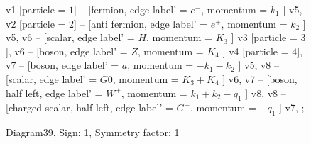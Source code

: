 \documentclass{revtex4}
\begin{document}
\begin{figure}[!htb]
\begin{center}
{    %
v1 [particle = \(1\)] -- [fermion, edge label' = \(e^{-}\), momentum = \(k_{1}\) ] v5, 
v2 [particle = \(2\)] -- [anti fermion, edge label' = \(e^{+}\), momentum = \(k_{2}\) ] v5, 
v6 -- [scalar, edge label' = \(H\), momentum = \(K_{3}\) ] v3 [particle = \(3\)], 
v6 -- [boson, edge label' = \(Z\), momentum = \(K_{4}\) ] v4 [particle = \(4\)], 
v7 -- [boson, edge label' = \(a\), momentum = \(-k_{1} - k_{2}\) ] v5, 
v8 -- [scalar, edge label' = \(G0\), momentum = \(K_{3} + K_{4}\) ] v6, 
v7 -- [boson, half left, edge label' = \(W^{+}\), momentum = \(k_{1} + k_{2} - q_{1}\) ] v8, 
v8 -- [charged scalar, half left, edge label' = \(G^{+}\), momentum = \(-q_{1}\) ] v7, 
};
\end{center}
\caption{Diagram39, Sign: 1, Symmetry factor: 1}
\end{figure}
\newpage
\end{document}
